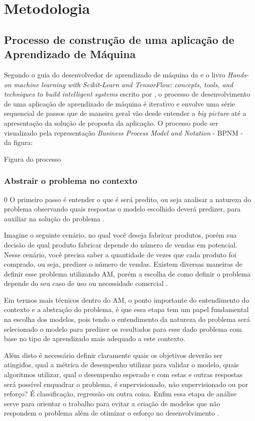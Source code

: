 \chapter{Metodologia}
\section{Processo de construção de uma aplicação de Aprendizado de Máquina}

Segundo o guia do desenvolvedor de aprendizado de máquina da \cite{Amazon} e o livro \textit{Hands-on machine learning with Scikit-Learn and TensorFlow: concepts, tools, and techniques to build intelligent systems} escrito por \cite{geron2017hands}, o processo de desenvolvimento de uma aplicação de aprendizado de máquina é iterativo e envolve uma série sequencial de passos que de maneira geral vão desde entender a \textit{big picture} até a apresentação da solução de proposta da aplicação. O processo pode ser visualizado pela representação \textit{Business Process Model and Notation} - BPNM - da figura:

Figura do processo 

\subsection{Abstrair o problema no contexto}
0
O primeiro passo é entender o que é será predito, ou seja analisar a natureza do problema observando quais respostas o modelo escolhido deverá predizer, para auxiliar na solução do problema \cite{geron2017hands}.

Imagine o seguinte cenário, no qual você deseja fabricar produtos, porém sua decisão de qual produto fabricar depende do número de vendas em potencial. Nesse cenário, você precisa saber a quantidade de vezes que cada produto foi comprado, ou seja, predizer o número de vendas. Existem diversas maneiras de definir esse problema utilizando AM, porém a escolha de como definir o problema depende do seu caso de uso ou necessidade comercial \cite{Amazon}.

Em termos mais técnicos dentro do AM, o ponto importante do entendimento do contexto e a abstração do problema, é que essa etapa tem um papel fundamental na escolha dos modelos, pois tendo o entendimento da natureza do problema será selecionado o modelo para predizer os resultados para esse dado problema com base no tipo de aprendizado mais adequado a este contexto.

Além disto é necessário definir claramente quais os objetivos deverão ser atingidos, qual a métrica de desempenho utilizar para validar o modelo, quais algoritmos utilizar, qual o desempenho esperado e com estas e outras respostas será possível enquadrar o problema, é supervisionado, não supervisionado ou por reforço? É classificação, regressão ou outra coisa\cite{geron2017hands}. Enfim essa etapa de análise serve para orientar o trabalho para evitar a criação de modelos que não respondem o problema além de otimizar o esforço no desenvolvimento \cite{Amazon}.

